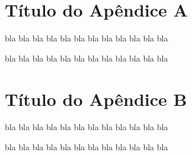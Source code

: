 \chapter{Título do Apêndice A}
bla bla bla bla bla bla bla bla bla bla bla bla

bla bla bla bla bla bla bla bla bla bla bla bla


\chapter{Título do Apêndice B}
bla bla bla bla bla bla bla bla bla bla bla bla

bla bla bla bla bla bla bla bla bla bla bla bla
